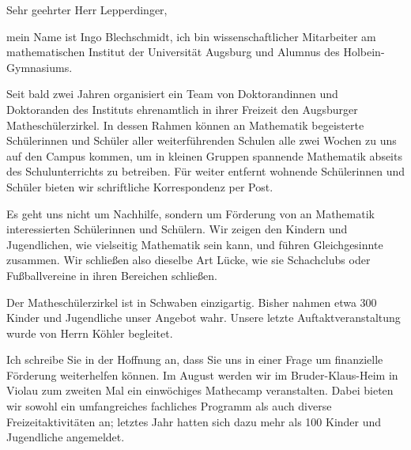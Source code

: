 \documentclass{../vorlagen/werbung/lehrerbriefe/zirkelbrief}
\begin{document}
\renewcommand{\anschrift}{%
      Herr Lepperdinger \\
      Hallstraße 10 \\
      86150 Augsburg}
\renewcommand{\datum}{\today}
\renewcommand{\betreff}{Matheschülerzirkel der Universität Augsburg}
\renewcommand{\absender}{%
      \textbf{Ingo Blechschmidt} \\
      \ \\
      Lehrstuhl für Algebra und Zahlentheorie \\
      Universitätsstr. 14 \\
      86159 Augsburg \\
      \ \\
      Telefon \> +49 (0) 821 598 -- 5601 \\
      Telefax \> +49 (0) 821 598 -- 2090 \\
      \textsf{blechschmidt@math.uni-augsburg.de} \\}

\makeletterhead

Sehr geehrter Herr Lepperdinger,

mein Name ist Ingo Blechschmidt, ich bin wissenschaftlicher Mitarbeiter
am mathematischen Institut der Universität Augsburg und Alumnus des
Holbein-Gymnasiums.

Seit bald zwei Jahren organisiert ein Team von Doktorandinnen und
Doktoranden des Instituts ehrenamtlich in ihrer Freizeit den Augsburger
Matheschülerzirkel. In dessen Rahmen können an Mathematik begeisterte
Schü\-ler\-in\-nen und Schüler aller weiterführenden Schulen alle zwei Wochen
zu uns auf den Campus kommen, um in kleinen Gruppen spannende Mathematik
abseits des Schulunterrichts zu betreiben. Für weiter entfernt wohnende
Schülerinnen und Schüler bieten wir schriftliche Korrespondenz per Post.

Es geht uns nicht um Nachhilfe, sondern um Förderung von an Mathematik
interessierten Schülerinnen und Schülern. Wir zeigen den Kindern und
Jugendlichen, wie vielseitig Mathematik sein kann, und führen
Gleichgesinnte zusammen. Wir schließen also dieselbe Art Lücke, wie sie
Schachclubs oder Fußballvereine in ihren Bereichen schließen.

Der Matheschülerzirkel ist in Schwaben einzigartig. Bisher nahmen etwa 300
Kinder und Jugendliche unser Angebot wahr. Unsere letzte
Auftaktveranstaltung wurde von Herrn Köhler begleitet.

Ich schreibe Sie in der Hoffnung an, dass Sie uns in einer Frage um
finanzielle Förderung weiterhelfen können. Im August werden wir im
Bruder-Klaus-Heim in Violau zum zweiten Mal ein einwöchiges Mathecamp
veranstalten. Dabei bieten wir sowohl ein umfangreiches fachliches
Programm als auch diverse Freizeitaktivitäten an; letztes Jahr hatten
sich dazu mehr als 100 Kinder und Jugendliche angemeldet.
\end{document}

